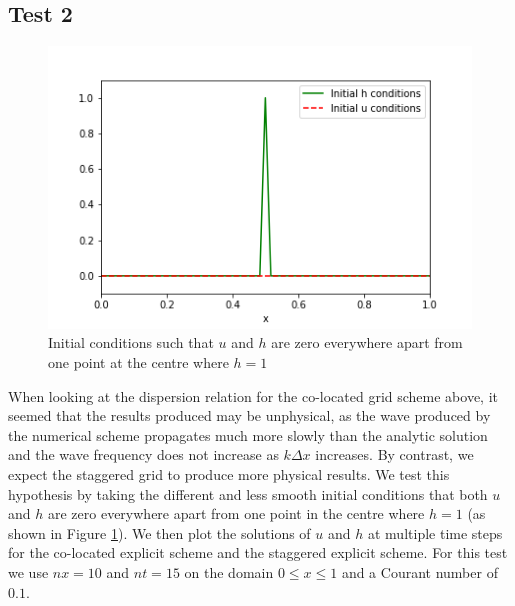 \documentclass[a4paper, 10pt, notitlepage]{article}
\begin{document}
\subsection{Test 2}
\begin{figure}[H]
\begin{center}
\begin{minipage}{.5\textwidth}
	\centering
	\captionsetup{width=2\textwidth}
	\captionsetup{justification=centering}
	\includegraphics[width=\textwidth]{initial_condition_spike.png}
	\caption{\label{initialconditionspike}Initial conditions such that $u$ and $h$ are zero everywhere apart from one point at the centre where $h = 1$} 
\end{minipage}
\end{center}
\end{figure}

When looking at the dispersion relation for the co-located grid scheme above, it seemed that the results produced may be unphysical, as the wave produced by the numerical scheme propagates much more slowly than the analytic solution and the wave frequency does not increase as $k\Delta x$ increases. By contrast, we expect the staggered grid to produce more physical results. We test this hypothesis by taking the different and less smooth initial conditions that both $u$ and $h$ are zero everywhere apart from one point in the centre where $h = 1$ (as shown in Figure \ref{initialconditionspike}). We then plot the solutions of $u$ and $h$ at multiple time steps for the co-located explicit scheme and the staggered explicit scheme. For this test we use $nx = 10$ and $nt = 15$ on the domain $0 \leq x \leq 1$ and a Courant number of $0.1$.
\end{document}

